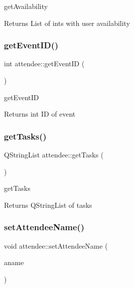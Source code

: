 get\+Availability 

\begin{DoxyReturn}{Returns}
List of ints with user availability 
\end{DoxyReturn}
\mbox{\label{classattendee_a401329192a983fa7ce39a23864082d9c}} 
\subsubsection{\texorpdfstring{get\+Event\+I\+D()}{getEventID()}}
{\footnotesize\ttfamily int attendee\+::get\+Event\+ID (\begin{DoxyParamCaption}{ }\end{DoxyParamCaption})}



get\+Event\+ID 

\begin{DoxyReturn}{Returns}
int ID of event 
\end{DoxyReturn}
\mbox{\label{classattendee_a69818adb55caa399615fa43b7b7f0588}} 
\subsubsection{\texorpdfstring{get\+Tasks()}{getTasks()}}
{\footnotesize\ttfamily Q\+String\+List attendee\+::get\+Tasks (\begin{DoxyParamCaption}{ }\end{DoxyParamCaption})}



get\+Tasks 

\begin{DoxyReturn}{Returns}
Q\+String\+List of tasks 
\end{DoxyReturn}
\mbox{\label{classattendee_a1474b7029b761e5c0bdd418d6b985ff9}} 
\subsubsection{\texorpdfstring{set\+Attendee\+Name()}{setAttendeeName()}}
{\footnotesize\ttfamily void attendee\+::set\+Attendee\+Name (\begin{DoxyParamCaption}\item[{Q\+String}]{aname }\end{DoxyParamCaption})}



